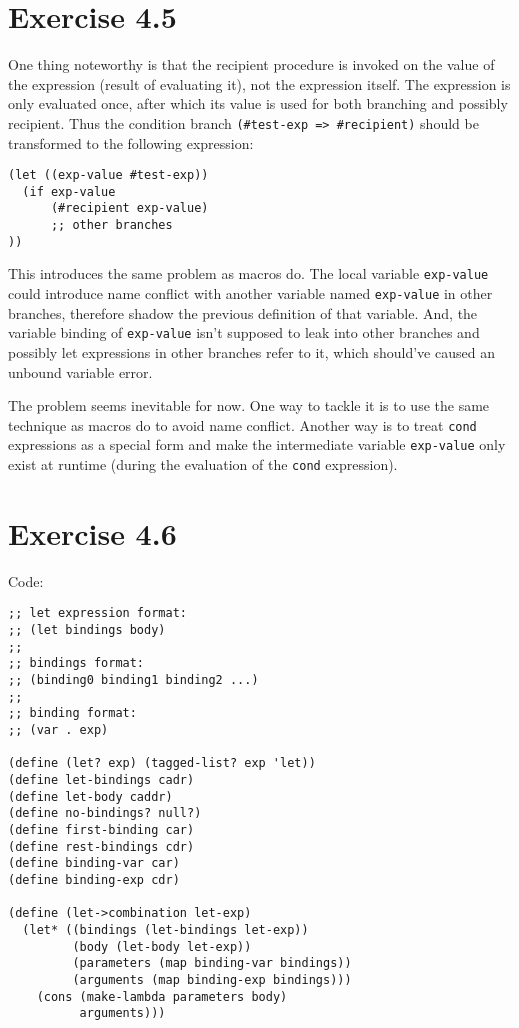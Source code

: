 \documentclass[../main.tex]{subfiles}
\begin{document}
\section{Exercise 4.5}

One thing noteworthy is that the recipient
procedure is invoked on the value of the expression
(result of evaluating it), not the expression itself.
The expression is only evaluated once, after which
its value is used for both branching and possibly
recipient. Thus the condition branch
\lstinline{(#test-exp => #recipient)} should be
transformed to the following expression:

\begin{lstlisting}
(let ((exp-value #test-exp))
  (if exp-value
      (#recipient exp-value)
      ;; other branches
))
\end{lstlisting}

This introduces the same problem as macros do. The local
variable \lstinline{exp-value} could introduce name conflict
with another variable named \lstinline{exp-value} in other branches,
therefore shadow the previous definition of that variable.
And, the variable binding of \lstinline{exp-value}
isn't supposed to leak into other branches and possibly
let expressions in other branches refer to it, which should've
caused an unbound variable error.

The problem seems inevitable for now. One way to tackle it is to use
the same technique as macros do to avoid name conflict. Another way
is to treat \lstinline{cond} expressions as a special form and
make the intermediate variable \lstinline{exp-value} only exist
at runtime (during the evaluation of the \lstinline{cond}
expression).

\section{Exercise 4.6}

Code:

\begin{lstlisting}
;; let expression format:
;; (let bindings body)
;;
;; bindings format:
;; (binding0 binding1 binding2 ...)
;;
;; binding format:
;; (var . exp)

(define (let? exp) (tagged-list? exp 'let))
(define let-bindings cadr)
(define let-body caddr)
(define no-bindings? null?)
(define first-binding car)
(define rest-bindings cdr)
(define binding-var car)
(define binding-exp cdr)

(define (let->combination let-exp)
  (let* ((bindings (let-bindings let-exp))
         (body (let-body let-exp))
         (parameters (map binding-var bindings))
         (arguments (map binding-exp bindings)))
    (cons (make-lambda parameters body)
          arguments)))
\end{lstlisting}
\end{document}
